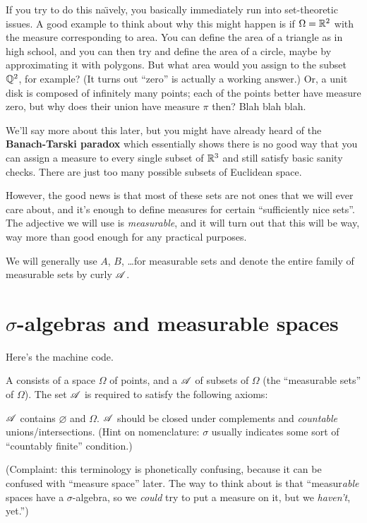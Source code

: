 If you try to do this na\"{\i}vely,
you basically immediately run into set-theoretic issues.
A good example to think about why this might happen
is if $\Omega = \mathbb R^2$ with the measure corresponding to area.
You can define the area of a triangle as in high school,
and you can then try and define the area of a circle,
maybe by approximating it with polygons.
But what area would you assign to the subset $\mathbb Q^2$, for example?
(It turns out ``zero'' is actually a working answer.)
Or, a unit disk is composed of infinitely many points;
each of the points better have measure zero,
but why does their union have measure $\pi$ then?
Blah blah blah.

We'll say more about this later, but
you might have already heard of the \textbf{Banach-Tarski paradox}
which essentially shows there is no good way that you can assign a
measure to every single subset of $\mathbb R^3$
and still satisfy basic sanity checks.
There are just too many possible subsets of Euclidean space.

However, the good news is that most of these sets are not ones
that we will ever care about,
and it's enough to define measures for certain
``sufficiently nice sets''.
The adjective we will use is \emph{measurable},
and it will turn out that this will be way, way more than good enough
for any practical purposes.

We will generally use $A$, $B$, \dots for measurable sets
and denote the entire family of measurable sets by curly $\mathscr A$.

\section{$\sigma$-algebras and measurable spaces}
Here's the machine code.
\begin{definition}
	A  consists of a space $\Omega$ of points,
	and a  $\mathscr A$ of subsets of $\Omega$
	(the ``measurable sets'' of $\Omega$).
	The set $\mathscr A$ is required to satisfy the following axioms:
	\begin{itemize}
		\ii $\mathscr A$ contains $\varnothing$ and $\Omega$.
		\ii $\mathscr A$ should be closed under complements and
		\emph{countable} unions/intersections.
		(Hint on nomenclature: $\sigma$ usually indicates
		some sort of ``countably finite'' condition.)
	\end{itemize}
\end{definition}
(Complaint: this terminology is phonetically confusing,
because it can be confused with ``measure space'' later.
The way to think about is that
``measur\emph{able} spaces have a $\sigma$-algebra, so we \emph{could}
try to put a measure on it, but we \emph{haven't}, yet.'')

